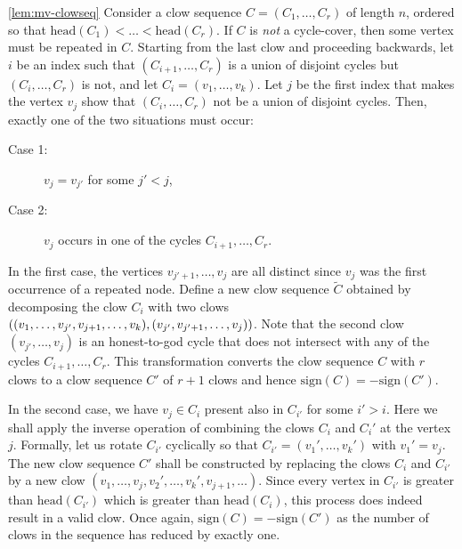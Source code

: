 \begin{proofof}{\autoref{lem:mv-clowseq}}
Consider a clow sequence $C = (C_1,\dots, C_r)$ of length $n$, ordered so that $\mathrm{head}(C_1) < \dots < \mathrm{head}(C_r)$. If $C$ is \emph{not} a cycle-cover, then some vertex must be repeated in $C$. Starting from the last clow and proceeding backwards, let $i$ be an index such that $(C_{i+1},\dots, C_{r})$ is a union of disjoint cycles but $(C_{i},\dots, C_r)$ is not, and let $C_i = (v_1,\dots, v_k)$. Let $j$ be the first index that makes the vertex $v_{j}$ show that $(C_i,\dots, C_r)$ not be a union of disjoint cycles. Then, exactly one of the two situations must occur:
\begin{description}
 \item[Case 1:] $v_{j} = v_{j'}$ for some $j' < j$,

 \item[Case 2:] $v_{j}$ occurs in one of the cycles $C_{i+1},\dots, C_r$. 
\end{description}

In the first case, the vertices $v_{j'+1},\dots, v_{j}$ are all distinct since $v_j$ was the first occurrence of a repeated node. Define a new clow sequence  $\tilde{C}$ obtained by decomposing the clow $C_i$ with two clows $\left((v_1,\dots, v_{j'},v_{j+1},\dots, v_k), (v_{j'},v_{j'+1},\dots,v_{j})\right)$. Note that the second clow $(v_{j'},\dots, v_j)$ is an honest-to-god cycle that does not intersect with any of the cycles $C_{i+1},\dots, C_r$. This transformation converts the clow sequence $C$ with $r$ clows to a clow sequence $C'$ of $r+1$ clows and hence $\mathrm{sign}(C) = - \mathrm{sign}(C')$. 

In the second case, we have $v_j \in C_i$ present also in $C_{i'}$ for some $i' > i$. Here we shall apply the inverse operation of combining the clows $C_i$ and $C_i'$ at the vertex $j$. Formally, let us rotate $C_{i'}$ cyclically so that $C_{i'} = (v_1',\dots, v_k')$ with $v_1' = v_j$. The new clow sequence $C'$ shall be constructed by replacing the clows $C_i$ and $C_{i'}$ by a new clow $(v_1,\dots, v_j, v_2',\dots, v_k', v_{j+1},\dots)$. Since every vertex in $C_{i'}$ is greater than $\mathrm{head}(C_{i'})$ which is greater than $\mathrm{head}(C_i)$, this process does indeed result in a valid clow. Once again, $\mathrm{sign}(C) = - \mathrm{sign}(C')$ as the number of clows in the sequence has reduced by exactly one.\\

\end{proofof}
